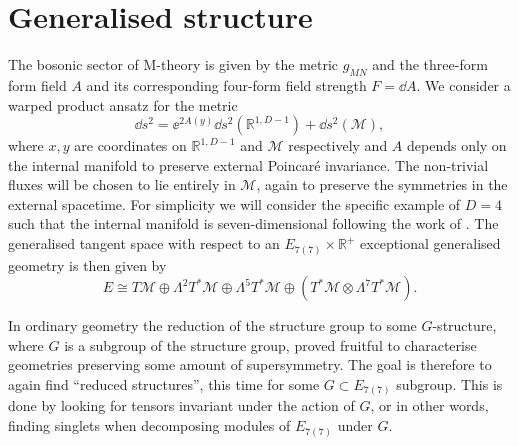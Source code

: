 \section{Generalised structure\label{sec:GeneralisedStructures}}
The bosonic sector of M-theory is given by the metric $g_{MN}$ and the three-form form field $A$ and its corresponding four-form field strength $F=\dd A$. We consider a warped product ansatz for the metric 
\begin{equation}
    \dd s^2 = \ee^{2A(y)}\dd s^2(\mathbb{R}^{1,D-1})+\dd s^2(\mathcal{M}),
\end{equation}
where $x,y$ are coordinates on $\mathbb{R}^{1,D-1}$ and $\mathcal{M}$ respectively and $A$ depends only on the internal manifold to preserve external Poincaré invariance. The non-trivial fluxes will be chosen to lie entirely in $\mathcal{M}$, again to preserve the symmetries in the external spacetime. For simplicity we will consider the specific example of $D=4$ such that the internal manifold is seven-dimensional following the work of \cite{Ashmore:2015joa}. The generalised tangent space with respect to an $E_{7(7)}\times\mathbb{R}^+$ exceptional generalised geometry is then given by 
\begin{equation}
    E \cong T\mathcal{M}\oplus\Lambda^2T^*\mathcal{M}\oplus\Lambda^5T^*\mathcal{M}\oplus\left(T^*\mathcal{M}\otimes\Lambda^7 T^*\mathcal{M}\right).
\end{equation}

\begin{comment}
Moreover, given $E$ we can construct the generalised frame bundle $F$ given by frames $\{E_A\}$, where $A=1,2,\ldots 56$. Explicitly, in a patch $U$ there exists a canonical basis given by 
\begin{equation}
    \{E_A\} = \{\pd/\pd y^m\}\cup \{\dd y^{m_1}\wedge\dd y^{m_2}\}\cup\{\dd y^{m_1}\wedge\ldots\wedge\dd y^{m_5}\}\cup \{\dd y^m\otimes\dd y^{m_1}\wedge\ldots\wedge\dd y^{m_7}\},
\end{equation}
and any other frame is related to such a frame by an $E_{7(7)}\times \mathbb{R}^+$ transformation, this then defines a principle bundle $F$ with structure group $E_{7(7)}\times \mathbb{R}^+$. Any other tensor field can then be constructed as sections of an associated vector bundle, thus making the exceptional group manifest in the formulation. 
\end{comment}

In ordinary geometry the reduction of the structure group to some $G$-structure, where $G$ is a subgroup of the structure group, proved fruitful to characterise geometries preserving some amount of supersymmetry. The goal is therefore to again find ``reduced structures'', this time for some $G\subset E_{7(7)}$ subgroup. This is done by looking for tensors invariant under the action of $G$, or in other words, finding singlets when decomposing modules of $E_{7(7)}$ under $G$. 

